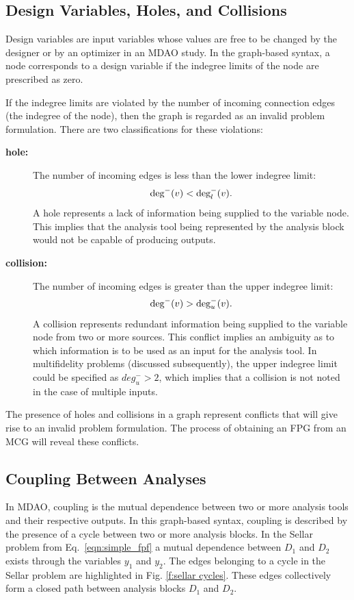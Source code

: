 \subsection{Design Variables, Holes, and Collisions}
  Design variables are input variables whose values are free to be 
  changed by the designer or by an optimizer in an MDAO study. In the graph-based 
  syntax, a node corresponds to a design variable if the indegree limits of the node are 
  prescribed as zero.

  If the indegree limits are violated by the number of incoming connection edges 
  (the indegree of the node), then the graph is regarded as an invalid problem formulation. 
  There are two classifications for these violations:
    \begin{description}
      \item[\bf{hole:}] The number of incoming edges is less than the lower indegree limit:
        \begin{equation} 
          \textrm{deg}^-(v) < \textrm{deg}_l^-(v). 
          \label{e:hole} 
        \end{equation}
        A hole represents a lack of information being supplied to the variable node. 
        This implies that the analysis tool being represented by the analysis block 
        would not be capable of producing outputs.
      \item[\bf{collision:}] The number of incoming edges is greater than the upper 
      indegree limit:
        \begin{equation} 
        \textrm{deg}^-(v) > \textrm{deg}_u^-(v). 
        \label{e:collision}
        \end{equation}A collision represents redundant information being supplied to 
        the variable node from two or more sources. This conflict implies an 
        ambiguity as to which information is to be used as an input for the analysis tool.
	In multifidelity problems (discussed subsequently), the upper indegree limit could be 
  specified as $deg_u^- > 2$, which implies that a collision is not noted in the case of 
  multiple inputs.
  \end{description} 

  The presence of holes and collisions in a graph represent conflicts that will give
  rise to an invalid problem formulation. The process of obtaining an FPG from an 
  MCG will reveal these conflicts.

\subsection{Coupling Between Analyses}
  In MDAO, coupling is the mutual dependence between two or more analysis 
  tools and their respective outputs. In this graph-based syntax, coupling is 
  described by the presence of a cycle between two or more analysis blocks. In the Sellar 
  problem from Eq.~\ref{eqn:simple_fpf} 
  a mutual dependence between $D_1$ and $D_2$ exists through the variables $y_1$ and $y_2$. 
  The edges belonging to a cycle in the Sellar problem are highlighted in 
  Fig. \ref{f:sellar cycles}.  These edges collectively form a closed path between 
  analysis blocks $D_1$ and $D_2$.

